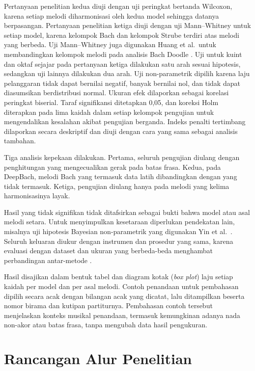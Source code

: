 Pertanyaan penelitian kedua diuji dengan uji peringkat bertanda Wilcoxon, karena setiap melodi diharmonisasi oleh kedua model sehingga datanya berpasangan. Pertanyaan penelitian ketiga diuji dengan uji Mann--Whitney untuk setiap model, karena kelompok Bach dan kelompok Strube terdiri atas melodi yang berbeda. Uji Mann--Whitney juga digunakan Huang et al.\ untuk membandingkan kelompok melodi pada analisis Bach Doodle \parencite{huang2019}. Uji untuk kuint dan oktaf sejajar pada pertanyaan ketiga dilakukan satu arah sesuai hipotesis, sedangkan uji lainnya dilakukan dua arah. Uji non-parametrik dipilih karena laju pelanggaran tidak dapat bernilai negatif, banyak bernilai nol, dan tidak dapat diasumsikan berdistribusi normal. Ukuran efek dilaporkan sebagai korelasi peringkat biserial. Taraf signifikansi ditetapkan 0,05, dan koreksi Holm diterapkan pada lima kaidah dalam setiap kelompok pengujian untuk mengendalikan kesalahan akibat pengujian berganda. Indeks penalti tertimbang dilaporkan secara deskriptif dan diuji dengan cara yang sama sebagai analisis tambahan.

Tiga analisis kepekaan dilakukan. Pertama, seluruh pengujian diulang dengan penghitungan yang mengecualikan gerak pada batas frasa. Kedua, pada DeepBach, melodi Bach yang termasuk data latih dibandingkan dengan yang tidak termasuk. Ketiga, pengujian diulang hanya pada melodi yang kelima harmonisasinya layak.

Hasil yang tidak signifikan tidak ditafsirkan sebagai bukti bahwa model atau asal melodi setara. Untuk menyimpulkan kesetaraan diperlukan pendekatan lain, misalnya uji hipotesis Bayesian non-parametrik yang digunakan Yin et al.\ \parencite{yin2023}. Seluruh keluaran diukur dengan instrumen dan prosedur yang sama, karena evaluasi dengan dataset dan ukuran yang berbeda-beda menghambat perbandingan antar-metode \parencite{araneda2023}.

Hasil disajikan dalam bentuk tabel dan diagram kotak (\textit{box plot}) laju setiap kaidah per model dan per asal melodi. Contoh penandaan untuk pembahasan dipilih secara acak dengan bilangan acak yang dicatat, lalu ditampilkan beserta nomor birama dan kutipan partiturnya. Pembahasan contoh tersebut menjelaskan konteks musikal penandaan, termasuk kemungkinan adanya nada non-akor atau batas frasa, tanpa mengubah data hasil pengukuran.

\section{Rancangan Alur Penelitian}

